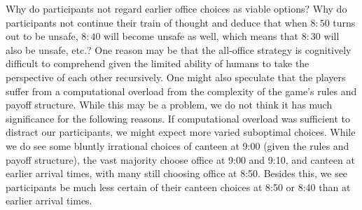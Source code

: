 Why do participants not regard earlier office choices as viable options? Why do participants not continue their train of thought and deduce that when $8{:}50$ turns out to be unsafe, $8{:}40$ will become unsafe as well, which means that $8{:}30$ will also be unsafe, etc.? One reason may be that the all-office strategy is cognitively difficult to comprehend given the  limited  ability of humans to take the perspective of each other recursively. 
One might also speculate that the players suffer from a 
computational overload from the complexity of the game's rules and payoff structure. While this may be a problem, we do not think it has much significance for the following reasons. If computational overload was sufficient to distract our participants, we might expect more varied suboptimal choices. While we do see some bluntly irrational choices of canteen at 9:00 (given the rules and payoff structure), the vast majority choose office at 9:00 and 9:10, and canteen at earlier arrival times, with many still choosing office at 8:50. Besides this, we see participants be much less certain of their canteen choices at 8:50 or 8:40 than at earlier arrival times. 

